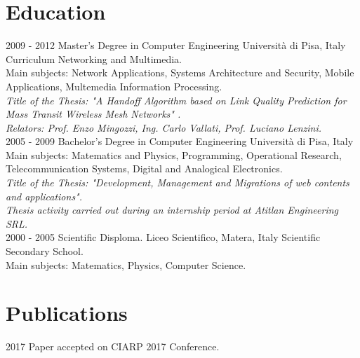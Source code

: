\documentclass[]{friggeri-cv}
\begin{document}
\section{Education}
\begin{entrylist}
  \entry
    {2009 - 2012}
    {Master's Degree in Computer Engineering}
    {Università di Pisa, Italy}
    {Curriculum Networking and Multimedia.\\
    Main subjects: Network Applications, Systems Architecture and Security, Mobile Applications, Multemedia Information            Processing.\\
    \emph{Title of the Thesis: "A Handoff Algorithm based on Link Quality Prediction for Mass Transit Wireless Mesh Networks"      .}\\
    \emph{Relators: Prof. Enzo Mingozzi, Ing. Carlo Vallati, Prof. Luciano Lenzini.}\\}
  \entry
    {2005 - 2009}
    {Bachelor's Degree in Computer Engineering}
    {Università di Pisa, Italy}
    {Main subjects: Matematics and Physics, Programming, Operational Research, Telecommunication Systems, Digital and Analogical Electronics.\\
    \emph{Title of the Thesis: "Development, Management and Migrations of web contents and applications".}\\
    \emph{Thesis activity carried out during an internship period at Atitlan Engineering SRL.}\\}
  \entry
    {2000 - 2005}
    {Scientific Disploma.}
    {Liceo Scientifico, Matera, Italy}
    {Scientific Secondary School.\\
    Main subjects: Matematics, Physics, Computer Science.}
\end{entrylist}


\section{Publications}
\begin{entrylist}
  \entry
    {2017}
    {}
    {}
    {
		Paper accepted on CIARP 2017 Conference.    
    }
\end{entrylist}
\end{document}
